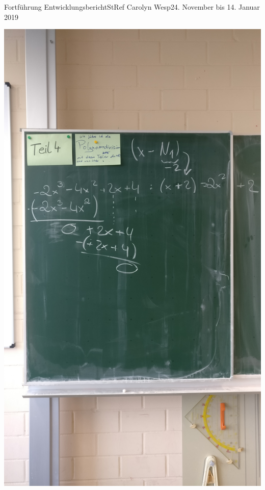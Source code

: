 \documentclass[oneside,openany,headings=optiontotoc,11pt,numbers=noenddot]{article}
\begin{document}
\begin{worksheet}{Fortführung Entwicklungsbericht}{StRef\grq{} Carolyn Wesp}{24. November bis 14. Januar 2019}
\begin{minipage}{0.48\textwidth}
			\includegraphics[width=\textwidth]{../Polynomdivision_1.jpg}
		\end{minipage}
		\hfill
		\begin{minipage}{0.48\textwidth}

\end{minipage}
\end{worksheet}
\end{document}
